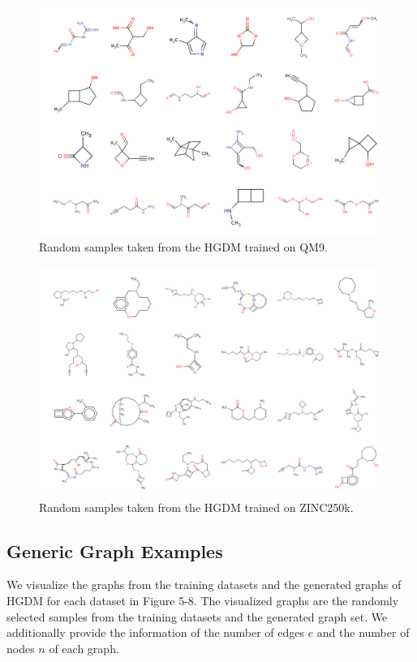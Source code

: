 \documentclass[letterpaper]{article} %
\begin{document}
\begin{figure}[tbp]
\centering
    \includegraphics[width=1.8\columnwidth]{qm9.png}
    \caption{Random samples taken from the HGDM trained on QM9.}
    \label{QM9}
\end{figure}
\begin{figure}[tbp]
\centering
    \includegraphics[width=1.8\columnwidth]{zinc.png}
    \caption{Random samples taken from the HGDM trained on ZINC250k.}
    \label{ZINC}
\end{figure}
\subsection{Generic Graph Examples}
We visualize the graphs from the training datasets and the generated graphs of HGDM for each dataset in Figure 5-8. The visualized graphs are the randomly selected samples from the training datasets and the generated graph set. We additionally provide the information of the number of edges $e$ and the number of nodes $n$ of each graph.
\end{document}
